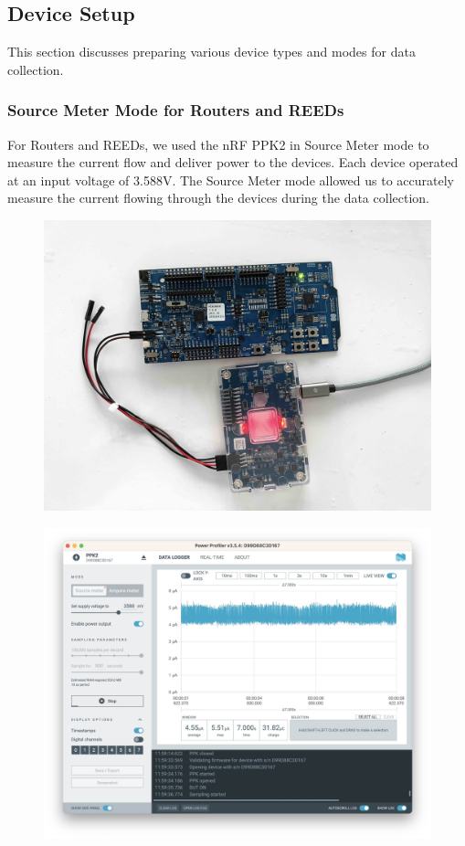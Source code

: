 \subsection{Device Setup}\label{sec:device_setup}
This section discusses preparing various device types and modes for data collection.

\subsubsection{Source Meter Mode for Routers and REEDs}\label{sec:source_meter_mode}
For Routers and REEDs, we used the nRF PPK2 in Source Meter mode to measure the current flow and deliver power to the devices. Each device operated at an input voltage of 3.588V. The Source Meter mode allowed us to accurately measure the current flowing through the devices during the data collection.

\begin{figure}[h]
    \centering
    \begin{minipage}[t]{0.45\textwidth}
        \centering
        \includegraphics[width=0.7\linewidth]{images/research_design/PPK2_Router.jpg}
        \label{fig:router_source_meter}
    \end{minipage}\hfill
    \begin{minipage}[t]{0.45\textwidth}
        \centering
        \includegraphics[width=0.7\linewidth]{images/research_design/PPK2_SDK.jpg}
        \label{fig:ppk2_source_meter}
    \end{minipage}
\end{figure}

